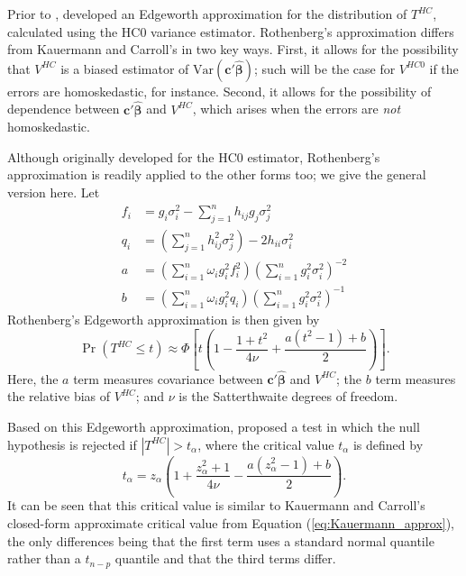 \documentclass[12pt]{article}\usepackage[]{graphicx}\usepackage[]{color}
\newcommand{\Var}{\text{Var}}
\newcommand{\bm}{\mathbf}
\newcommand{\bs}{\boldsymbol}
\begin{document}
Prior to \citet{Kauermann2001note}, \citet{Rothenberg1988approximate} developed an Edgeworth approximation for the distribution of $T^{HC}$, calculated using the HC0 variance estimator. Rothenberg's approximation differs from Kauermann and Carroll's in two key ways. First, it allows for the possibility that $V^{HC}$ is a biased estimator of $\Var\left(\bm{c}'\bs{\hat\beta}\right)$; such will be the case for $V^{HC0}$ if the errors are homoskedastic, for instance. Second, it allows for the possibility of dependence between $\bm{c}'\bs{\hat\beta}$ and $V^{HC}$, which arises when the errors are \textit{not} homoskedastic.

Although originally developed for the HC0 estimator, Rothenberg's approximation is readily applied to the other forms too; we give the general version here. Let
\begin{align*}
f_i &= g_i \sigma_i^2 - \sum_{j=1}^n h_{ij} g_j \sigma_j^2 \\ 
q_i &= \left(\sum_{j=1}^n h_{ij}^2 \sigma_j^2 \right) - 2 h_{ii} \sigma_i^2 \\
a &= \left(\sum_{i=1}^n \omega_i g_i^2 f_i^2\right) \left(\sum_{i=1}^n g_i^2 \sigma_i^2\right)^{-2} \\
b &= \left(\sum_{i=1}^n \omega_i g_i^2 q_i\right) \left(\sum_{i=1}^n g_i^2 \sigma_i^2\right)^{-1}
\end{align*}
Rothenberg's Edgeworth approximation is then given by 
\[
\Pr\left(T^{HC} \leq t \right) \approx \Phi\left[t \left(1 - \frac{1 + t^2}{4 \nu} + \frac{a\left(t^2 - 1\right) + b}{2}\right)\right]. 
\]
Here, the $a$ term measures covariance between $\bm{c}'\bs{\hat\beta}$ and $V^{HC}$; the $b$ term measures the relative bias of $V^{HC}$; and $\nu$ is the Satterthwaite degrees of freedom. 

Based on this Edgeworth approximation, \citet{Rothenberg1988approximate} proposed a test in which the null hypothesis is rejected if $\left|T^{HC}\right| > t_{\alpha}$, where the critical value $t_{\alpha}$ is defined by 
\begin{equation}
\label{eq:edge_Roth}
t_\alpha = z_{\alpha}\left(1 + \frac{z_{\alpha}^2 + 1}{4 \nu} - \frac{a\left(z_{\alpha}^2 - 1\right) + b}{2}\right).
\end{equation}
It can be seen that this critical value is similar to Kauermann and Carroll's closed-form approximate critical value from Equation (\ref{eq:Kauermann_approx}), the only differences being that the first term uses a standard normal quantile rather than a $t_{n - p}$ quantile and that the third terms differ. 
\end{document}
